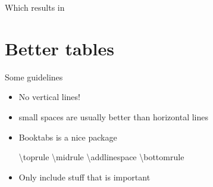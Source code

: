 \documentclass[ignorenonframetext,]{beamer}
\newenvironment{Shaded}{\begin{snugshade}}{\end{snugshade}}
\newcommand{\NormalTok}[1]{{#1}}
\begin{document}
\begin{frame}{Which results in}


\end{frame}

\section{Better tables}\label{better-tables}

\begin{frame}[fragile]{Some guidelines}

\begin{itemize}
\item
  No vertical lines!
\item
  small spaces are usually better than horizontal lines
\item
  Booktabs is a nice package

\begin{Shaded}
\begin{Highlighting}[]
\NormalTok{\textbackslash{}toprule}
\NormalTok{\textbackslash{}midrule}
\NormalTok{\textbackslash{}addlinespace}
\NormalTok{\textbackslash{}bottomrule}
\end{Highlighting}
\end{Shaded}
\item
  Only include stuff that is important
\end{itemize}

\end{frame}
\end{document}
